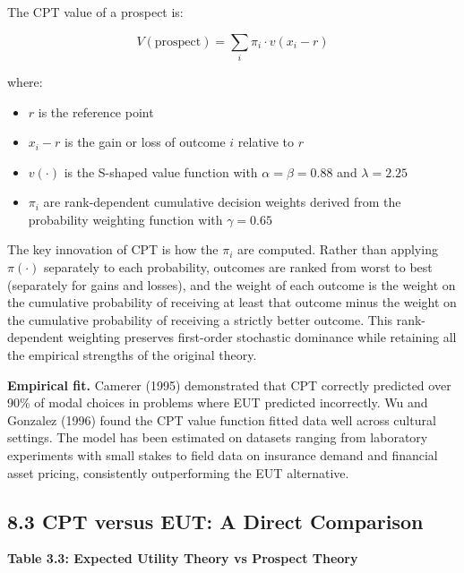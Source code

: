 \documentclass[12pt, letterpaper]{article}
\begin{document}
The CPT value of a prospect is:

$$V(\text{prospect}) = \sum_{i} \pi_i \cdot v(x_i - r)$$

where:
\begin{itemize}
\item $r$ is the reference point
\item $x_i - r$ is the gain or loss of outcome $i$ relative to $r$
\item $v(\cdot)$ is the S-shaped value function with $\alpha = \beta = 0.88$ and $\lambda = 2.25$
\item $\pi_i$ are rank-dependent cumulative decision weights derived from the probability weighting function with $\gamma = 0.65$
\end{itemize}

The key innovation of CPT is how the $\pi_i$ are computed. Rather than applying $\pi(\cdot)$ separately to each probability, outcomes are ranked from worst to best (separately for gains and losses), and the weight of each outcome is the weight on the cumulative probability of receiving at least that outcome minus the weight on the cumulative probability of receiving a strictly better outcome. This rank-dependent weighting preserves first-order stochastic dominance while retaining all the empirical strengths of the original theory.

\textbf{Empirical fit.} Camerer (1995) demonstrated that CPT correctly predicted over 90\% of modal choices in problems where EUT predicted incorrectly. Wu and Gonzalez (1996) found the CPT value function fitted data well across cultural settings. The model has been estimated on datasets ranging from laboratory experiments with small stakes to field data on insurance demand and financial asset pricing, consistently outperforming the EUT alternative.


\subsection{8.3 CPT versus EUT: A Direct Comparison}


\textbf{Table 3.3: Expected Utility Theory vs Prospect Theory}
\end{document}
